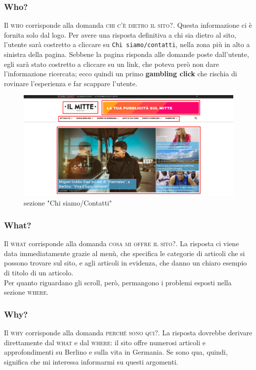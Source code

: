 \subsubsection{Who?}
Il \textsc{who} corrisponde alla domanda \textsc{chi c'è dietro il sito?}. Questa informazione ci è fornita solo dal logo. Per avere una risposta definitiva a chi sia dietro al sito, l'utente sarà costretto a cliccare su \texttt{Chi siamo/contatti}, nella zona più in alto a sinistra della pagina. Sebbene la pagina risponda alle domande poste dall'utente, egli sarà stato costretto a cliccare su un link, che poteva però non dare l'informazione ricercata; ecco quindi un primo \textbf{gambling click} che rischia di rovinare l'esperienza e far scappare l'utente.

\vspace{30pt}
\begin{figure}[htbp]
\begin{center}
\includegraphics[width=35em]{img/home1}
\caption{sezione "Chi siamo/Contatti"}
\end{center}
\end{figure}
\vspace{30pt}


\subsubsection{What?}
Il \textsc{what} corrisponde alla domanda \textsc{cosa mi offre il sito?}. La risposta ci viene data immediatamente grazie al menù, che specifica le categorie di articoli che si possono trovare sul sito, e agli articoli in evidenza, che danno un chiaro esempio di titolo di un articolo. \\
Per quanto riguardano gli scroll, però, permangono i problemi esposti nella sezione \textsc{where}.

\subsubsection{Why?}
Il \textsc{why} corrisponde alla domanda \textsc{perché sono qui?}. La risposta dovrebbe derivare direttamente dal \textsc{what} e dal \textsc{where}: il sito offre numerosi articoli e approfondimenti su Berlino e sulla vita in Germania. Se sono qua, quindi, significa che mi interessa informarmi su questi argomenti.

